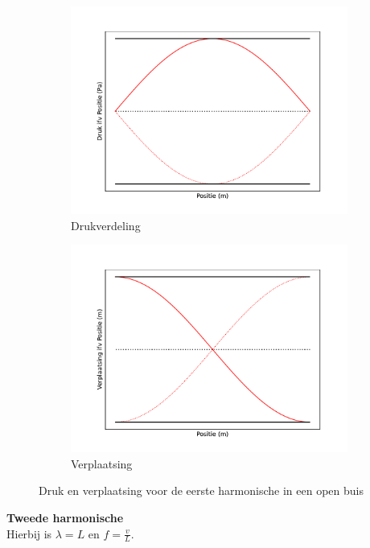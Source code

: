 \documentclass[a4paper,kul]{kulakarticle} %
\begin{document}
\begin{figure}[h]
	\centering
	\begin{subfigure}{.5\textwidth}
		\centering
		\includegraphics[width=1\linewidth]{OpenBuisEersteDruk}
		\caption{Drukverdeling}
		\label{fig:EersteBuisDruk}
	\end{subfigure}%
	\begin{subfigure}{.5\textwidth}
		\centering
		\includegraphics[width=1\linewidth]{OpenBuisEersteVerplaatsing}
		\caption{Verplaatsing}
		\label{fig:EersteBuisVerplaatsing}
	\end{subfigure}
	\caption{Druk en verplaatsing voor de eerste harmonische in een open buis}
	\label{fig:OpenBuisEerste}
\end{figure}
\newpage
\textbf{Tweede harmonische}\\
Hierbij is $\lambda = L$ en $f=\frac{v}{L}$.
\end{document}
